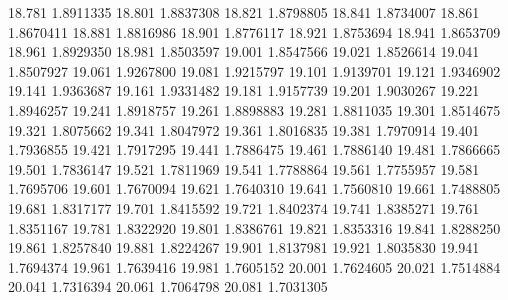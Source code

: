 18.781 1.8911335
18.801 1.8837308
18.821 1.8798805
18.841 1.8734007
18.861 1.8670411
18.881 1.8816986
18.901 1.8776117
18.921 1.8753694
18.941 1.8653709
18.961 1.8929350
18.981 1.8503597
19.001 1.8547566
19.021 1.8526614
19.041 1.8507927
19.061 1.9267800
19.081 1.9215797
19.101 1.9139701
19.121 1.9346902
19.141 1.9363687
19.161 1.9331482
19.181 1.9157739
19.201 1.9030267
19.221 1.8946257
19.241 1.8918757
19.261 1.8898883
19.281 1.8811035
19.301 1.8514675
19.321 1.8075662
19.341 1.8047972
19.361 1.8016835
19.381 1.7970914
19.401 1.7936855
19.421 1.7917295
19.441 1.7886475
19.461 1.7886140
19.481 1.7866665
19.501 1.7836147
19.521 1.7811969
19.541 1.7788864
19.561 1.7755957
19.581 1.7695706
19.601 1.7670094
19.621 1.7640310
19.641 1.7560810
19.661 1.7488805
19.681 1.8317177
19.701 1.8415592
19.721 1.8402374
19.741 1.8385271
19.761 1.8351167
19.781 1.8322920
19.801 1.8386761
19.821 1.8353316
19.841 1.8288250
19.861 1.8257840
19.881 1.8224267
19.901 1.8137981
19.921 1.8035830
19.941 1.7694374
19.961 1.7639416
19.981 1.7605152
20.001 1.7624605
20.021 1.7514884
20.041 1.7316394
20.061 1.7064798
20.081 1.7031305
